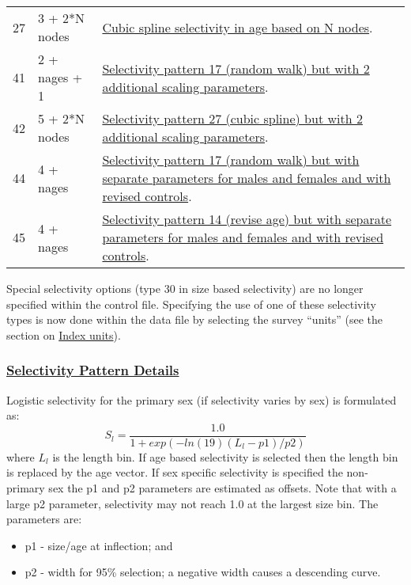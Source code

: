 \begin{longtable}{p{2cm} p{3cm} p{10cm}}
	27 \Tstrut & 3 + 2*N nodes & \hyperlink{cubic-spline}{Cubic spline selectivity in age based on N nodes}. \\
	41 \Tstrut & 2 + nages + 1 & \hyperlink{RandomWalkScaling}{Selectivity pattern 17 (random walk) but with 2 additional scaling parameters}. \\
	42 \Tstrut & 5 + 2*N nodes & \hyperlink{CubicSplineScaling}{Selectivity pattern 27 (cubic spline) but with 2 additional scaling parameters}. \\
	44 \Tstrut & 4 + nages & \hyperlink{Pattern44}{Selectivity pattern 17 (random walk) but with separate parameters for males and females and with revised controls}. \\
	45 \Tstrut & 4 + nages & \hyperlink{Pattern45}{Selectivity pattern 14 (revise age) but with separate parameters for males and females and with revised controls}. \Bstrut\\
	\hline
\end{longtable}

Special selectivity options (type 30 in size based selectivity) are no longer specified within the control file. Specifying the use of one of these selectivity types is now done within the data file by selecting the survey ``units'' (see the section on \hyperlink{IndexUnits}{Index units}).

\hypertarget{SelPattern}{}
\subsubsection[Selectivity Pattern Details]{\protect\hyperlink{SelPattern}{Selectivity Pattern Details}}

\hypertarget{LogisticSelectivity}{}
Logistic selectivity for the primary sex (if selectivity varies by sex) is formulated as:
	\begin{equation}
	S_l = \frac{1.0}{1+exp(-ln(19)(L_l - p1)/p2)}
	\end{equation}
where $L_l$ is the length bin. If age based selectivity is selected then the length bin is replaced by the age vector. If sex specific selectivity is specified the non-primary sex the p1 and p2 parameters are estimated as offsets. Note that with a large p2 parameter, selectivity may not reach 1.0 at the largest size bin. The parameters are:
\begin{itemize}
	\item p1 - size/age at inflection; and
	\item p2 - width for 95\% selection; a negative width causes a descending curve.
\end{itemize}


